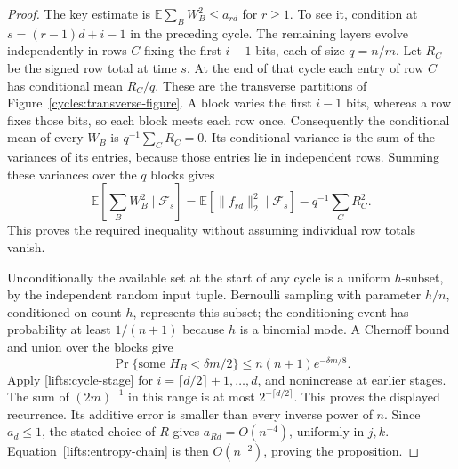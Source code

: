 \begin{proof}
The key estimate is $\mathbb E\sum_BW_B^2\le a_{rd}$ for $r\ge1$.
To see it, condition at $s=(r-1)d+i-1$ in the preceding cycle.
The remaining layers evolve independently in rows $C$ fixing the
first $i-1$ bits, each of size $q=n/m$. Let $R_C$ be the signed row
total at time $s$. At the end of that cycle each entry of row $C$
has conditional mean $R_C/q$. These are the transverse partitions
of Figure~\ref{cycles:transverse-figure}. A block varies the first $i-1$ bits,
whereas a row fixes those bits, so each block meets each row once.
Consequently the conditional mean of every $W_B$ is
$q^{-1}\sum_CR_C=0$. Its conditional variance is the sum of the
variances of its entries, because those entries lie in independent
rows. Summing these variances over the $q$ blocks gives
\begin{equation}
 \mathbb E\left[\sum_BW_B^2\mid\mathcal F_s\right]
 =\mathbb E[\|f_{rd}\|_2^2\mid\mathcal F_s]
                         -q^{-1}\sum_CR_C^2.
 \label{lifts:cycle-variance-identity}
\end{equation}
This proves the required inequality without assuming individual row
totals vanish.

Unconditionally the available set at the start of any cycle is a uniform
$h$-subset, by the independent random input tuple. Bernoulli sampling
with parameter $h/n$, conditioned on count $h$, represents this subset;
the conditioning event has probability at least $1/(n+1)$ because $h$
is a binomial mode. A Chernoff bound and union over the blocks give
\[
 \Pr\{\text{some }H_B<\delta m/2\}
       \le n(n+1)e^{-\delta m/8}.
\]
Apply \eqref{lifts:cycle-stage} for
$i=\lceil d/2\rceil+1,\ldots,d$, and nonincrease at earlier stages.
The sum of $(2m)^{-1}$ in this range is at most
$2^{-\lceil d/2\rceil}$. This proves the displayed recurrence.
Its additive error is smaller than every inverse power of $n$.
Since $a_d\le1$, the stated choice of $R$ gives
$a_{Rd}=O(n^{-4})$, uniformly in $j,k$. Equation~\eqref{lifts:entropy-chain}
is then $O(n^{-2})$, proving the proposition.
\end{proof}


